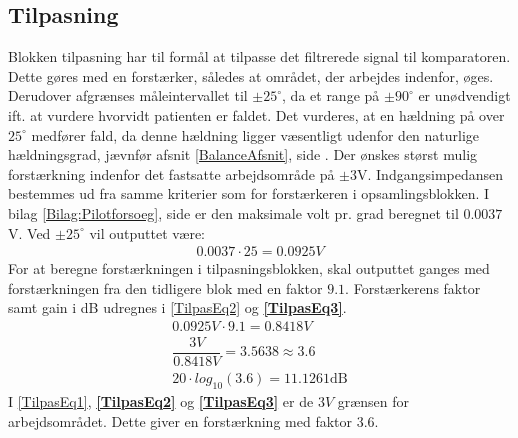 \subsection{Tilpasning}\label{Tilpasningsblok}
Blokken tilpasning har til formål at tilpasse det filtrerede signal til komparatoren. Dette gøres med en forstærker, således at området, der arbejdes indenfor, øges. Derudover afgrænses måleintervallet til $\pm25^{\circ}$, da et range på $\pm90^{\circ}$ er unødvendigt ift. at vurdere hvorvidt patienten er faldet. Det vurderes, at en hældning på over $25^{\circ}$ medfører fald, da denne hældning ligger væsentligt udenfor den naturlige hældningsgrad, jævnfør afsnit \ref{BalanceAfsnit}, side \pageref{BalanceAfsnit}. Der ønskes størst mulig forstærkning indenfor det fastsatte arbejdsområde på $\pm3$V. Indgangsimpedansen bestemmes ud fra samme kriterier som for forstærkeren i opsamlingsblokken. I bilag \ref{Bilag:Pilotforsoeg}, side \pageref{Bilag:Pilotforsoeg} er den maksimale volt pr. grad beregnet til $0.0037$V. Ved $\pm25^{\circ}$ vil outputtet være:
\begin{align}
\label{Udreg3} 0.0037 \cdot 25 = 0.0925V
\end{align}
\noindent For at beregne forstærkningen i tilpasningsblokken, skal outputtet ganges med forstærkningen fra den tidligere blok med en faktor $9.1$. Forstærkerens faktor samt gain i dB udregnes i \eqref{TilpasEq2} og \textbf{\ref{TilpasEq3}}.
\begin{align}
\label{TilpasEq1} 0.0925V \cdot 9.1 = 0.8418V \\
\label{TilpasEq2} \dfrac{3V}{0.8418V} = 3.5638 \approx 3.6 \\
\label{TilpasEq3} 20 \cdot log_{10} (3.6) = 11.1261\text{dB}
\end{align} 
\noindent I \eqref{TilpasEq1}, \textbf{\ref{TilpasEq2}} og \textbf{\ref{TilpasEq3}} er de $3V$ grænsen for arbejdsområdet. Dette giver en forstærkning med faktor $3.6$. \\

